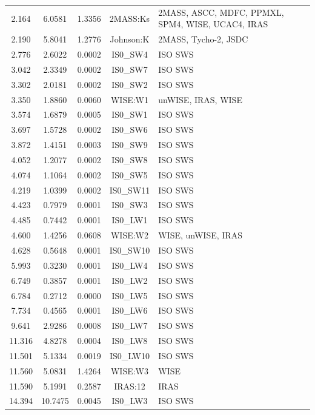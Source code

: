 \documentclass[11pt]{article}
\begin{document}
\begin{table}[htbp]
{\begin{tabular*}{\textwidth}{@{\extracolsep{\fill}}ccccp{5.5cm}}
        2.164 &  6.0581   & 1.3356& 2MASS:Ks & 2MASS, ASCC, MDFC, PPMXL, SPM4, WISE, UCAC4, IRAS \\
        2.190 &  5.8041   & 1.2776& Johnson:K & 2MASS, Tycho-2, JSDC \\
        2.776 &  2.6022   & 0.0002& IS0\_SW4 & ISO SWS \\
        3.042 &  2.3349   & 0.0002& IS0\_SW7 & ISO SWS \\
        3.302 &  2.0181   & 0.0002& IS0\_SW2 & ISO SWS \\
        3.350 &  1.8860   & 0.0060& WISE:W1 & unWISE, IRAS, WISE \\
        3.574 &  1.6879   & 0.0005& IS0\_SW1 & ISO SWS \\
        3.697 &  1.5728   & 0.0002& IS0\_SW6 & ISO SWS \\
        3.872 &  1.4151   & 0.0003& IS0\_SW9 & ISO SWS \\
        4.052 &  1.2077   & 0.0002& IS0\_SW8 & ISO SWS \\
        4.074 &  1.1064   & 0.0002& IS0\_SW5 & ISO SWS \\
        4.219 &  1.0399   & 0.0002& IS0\_SW11 & ISO SWS \\
        4.423 &  0.7979   & 0.0001& IS0\_SW3 & ISO SWS \\
        4.485 &  0.7442   & 0.0001& IS0\_LW1 & ISO SWS \\
        4.600 &  1.4256   & 0.0608& WISE:W2 &  WISE, unWISE, IRAS \\
        4.628 &  0.5648   & 0.0001& IS0\_SW10 & ISO SWS \\
        5.993 &  0.3230   & 0.0001& IS0\_LW4 & ISO SWS \\
        6.749 &  0.3857   & 0.0001& IS0\_LW2 & ISO SWS \\
        6.784 &  0.2712   & 0.0000& IS0\_LW5 & ISO SWS \\
        7.734 &  0.4565   & 0.0001& IS0\_LW6 & ISO SWS \\
        9.641 &  2.9286   & 0.0008& IS0\_LW7 & ISO SWS \\
        11.316 & 4.8278  & 0.0004  & IS0\_LW8 & ISO SWS \\
        11.501 & 5.1334  & 0.0019  & IS0\_LW10 & ISO SWS \\
        11.560 & 5.0831  & 1.4264  & WISE:W3 & WISE \\
        11.590 & 5.1991  & 0.2587  & IRAS:12 & IRAS \\
        14.394 & 10.7475 & 0.0045  & IS0\_LW3 & ISO SWS \\

\end{tabular*}}
\end{table}
\end{document}
